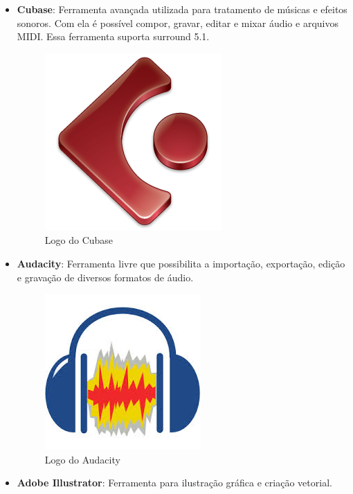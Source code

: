 \documentclass[11pt]{article} %
\begin{document}
\begin{itemize}

\item \textbf{Cubase}: Ferramenta avançada utilizada para tratamento de músicas e efeitos sonoros. Com ela é possível compor, gravar, editar e mixar áudio e arquivos MIDI. Essa ferramenta suporta surround 5.1.

\newpage

\begin{figure}[!htp]
\centering
\includegraphics[scale=0.3]{res/cubase-Logo.png}
\caption{Logo do Cubase}
\label{Cubase}
\end{figure}

\item \textbf{Audacity}: Ferramenta livre que possibilita a importação, exportação, edição e gravação de diversos formatos de áudio.

\begin{figure}[!htp]
\centering
\includegraphics[scale=0.3]{res/audacity.jpg}
\caption{Logo do Audacity}
\label{Audacity}
\end{figure}

\item \textbf{Adobe Illustrator}: Ferramenta para ilustração gráfica e criação vetorial.


\end{itemize}
\end{document}
